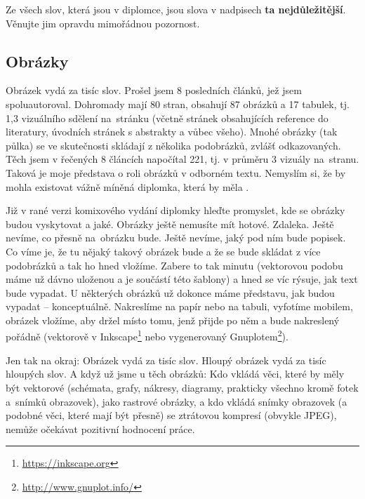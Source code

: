 Ze všech slov, která jsou v diplomce, jsou slova v nadpisech \textbf{ta nejdůležitější}. Věnujte jim opravdu mimořádnou pozornost.

\subsection*{Obrázky}
Obrázek vydá za tisíc slov. Prošel jsem 8 posledních článků, jež jsem spoluautoroval. Dohromady mají 80 stran, obsahují 87 obrázků a 17 tabulek, tj. 1,3 vizuálního sdělení na~stránku (včetně stránek obsahujících reference do literatury, úvodních stránek s abstrakty a vůbec všeho). Mnohé obrázky (tak půlka) se ve skutečnosti skládají z několika podobrázků, zvlášť odkazovaných. Těch jsem v řečených 8 článcích napočítal 221, tj. v průměru 3 vizuály na~stranu. Taková je moje představa o roli obrázků v odborném textu. Nemyslím si, že by mohla existovat vážně míněná diplomka, která by měla .

Již v rané verzi komixového vydání diplomky hleďte promyslet, kde se obrázky budou vyskytovat a jaké. Obrázky ještě nemusíte mít hotové. Zdaleka. Ještě nevíme, co přesně na~obrázku bude. Ještě nevíme, jaký pod ním bude popisek. Co víme je, že tu nějaký takový obrázek bude a že se bude skládat z více podobrázků a tak ho hned vložíme. Zabere to tak minutu (vektorovou podobu  máme už dávno uloženou a je součástí této šablony) a hned se víc rýsuje, jak text bude vypadat.
U některých obrázků už dokonce máme představu, jak budou vypadat -- konceptuálně. Nakreslíme na papír nebo na tabuli, vyfotíme mobilem, obrázek vložíme, aby držel místo tomu, jenž přijde po něm a bude nakreslený pořádně (vektorově v Inkscape\footnote{\url{https://inkscape.org}} nebo vygenerovaný Gnuplotem\footnote{\url{http://www.gnuplot.info/}}).

Jen tak na okraj: Obrázek vydá za tisíc slov. Hloupý obrázek vydá za tisíc hloupých slov. A když už jsme u těch obrázků: Kdo vkládá věci, které by měly být vektorové (schémata, grafy, nákresy, diagramy, prakticky všechno kromě fotek a~snímků obrazovek), jako rastrové obrázky, a kdo vkládá snímky obrazovek (a podobné věci, které mají být přesně) se ztrátovou kompresí (obvykle JPEG), nemůže očekávat pozitivní hodnocení práce.

